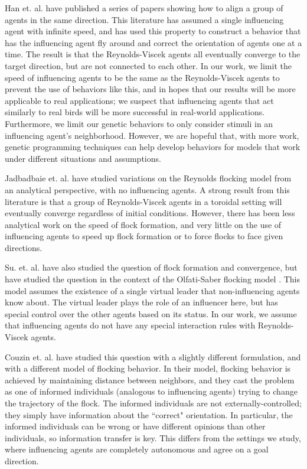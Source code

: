 Han et. al. have \cite{han2010teleporting} published a series of papers showing how
to align a group of agents in the same direction.
This literature has assumed a single influencing agent with infinite speed, and
has used this property to construct a behavior that has the influencing agent
fly around and correct the orientation of agents one at a time.
The result is that the Reynolds-Viscek agents all eventually converge to the target
direction, but are not connected to each other.
In our work, we limit the speed of influencing agents to be the same as the
Reynolds-Viscek agents to prevent the use of behaviors like this, and in hopes
that our results will be more applicable to real applications; we suspect that
influencing agents that act similarly to real birds will be more successful in
real-world applications.
Furthermore, we limit our genetic behaviors to only consider stimuli in an
influencing agent's neighborhood.
However, we are hopeful that, with more work, genetic programming techniques
can help develop behaviors for models that work under different situations and
assumptions.

Jadbadbaie et. al. \cite{jad2003convergence} have studied variations on the
Reynolds flocking model from an analytical perspective, with no influencing agents.
A strong result from this literature is that a group of Reynolds-Viscek agents in
a toroidal setting will eventually converge regardless of initial conditions.
However, there has been less analytical work on the speed of flock formation, and
very little on the use of influencing agents to speed up flock formation or to
force flocks to face given directions.

Su. et. al. \cite{su2009virtualleaderinformed} have also studied the question of
flock formation and convergence, but have studied the question in the context of
the Olfati-Saber flocking model \cite{olfati2006virtualleaderinformed}.
This model assumes the existence of a single virtual leader that non-influencing
agents know about.
The virtual leader plays the role of an influencer here, but has special control
over the other agents based on its status.
In our work, we assume that influencing agents do not have any special
interaction rules with Reynolds-Viscek agents.

Couzin et. al. \cite{couzin2005} have studied this question with a slightly
different
formulation, and with a different model of flocking behavior.
In their model, flocking behavior is achieved by maintaining distance between
neighbors, and they cast the problem as one of informed individuals (analogous to
influencing agents) trying to change the trajectory of the flock.
The informed individuals are not externally-controlled; they simply have
information about the ``correct" orientation.
In particular, the informed individuals can be wrong or have different opinions
than other individuals, so information transfer is key.
This differs from the settings we study, where influencing agents are completely
autonomous and agree on a goal direction.

